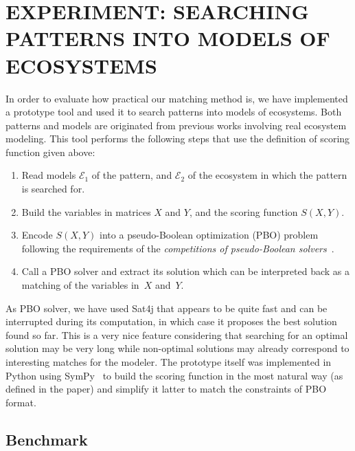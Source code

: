 \documentclass[a4paper,twoside]{article}
\begin{document}
\section{\uppercase{Experiment: searching patterns into models of ecosystems}}
\label{sec:experiments}

In order to evaluate how practical our matching method is, we have implemented a prototype tool and used it to search patterns into models of ecosystems.
Both patterns and models are originated from previous works involving  real ecosystem modeling.
This tool performs the following steps that use the definition of scoring function given above:
%
\begin{enumerate}
\item Read  models $\mathcal{E}_1$ of the pattern, and
  $\mathcal{E}_2$ of the ecosystem in which the pattern is searched for.
\item Build the variables in matrices $X$ and $Y$, and the scoring function
  $S(X,Y)$.
\item Encode $S(X,Y)$ into a pseudo-Boolean optimization (PBO) problem following the requirements of the \emph{competitions of pseudo-Boolean solvers}~\cite{opb-format,pb16}.
\item Call a PBO solver and extract its solution which can be interpreted back as a matching of the variables in~$X$ and~$Y$.
\end{enumerate}
%
As  PBO solver, we have used Sat4j that appears to be quite fast and can be interrupted during its computation, in which case it proposes the best solution found so far.
This is a very nice feature considering that searching for an optimal solution may be very long while non-optimal solutions may already correspond to interesting matches for the modeler.
The prototype itself was implemented in Python using SymPy~\cite{sympy} to build the scoring function in the most natural way (\ie as defined in the paper) and simplify it latter to match the constraints of PBO format.

\subsection{Benchmark}
\end{document}
